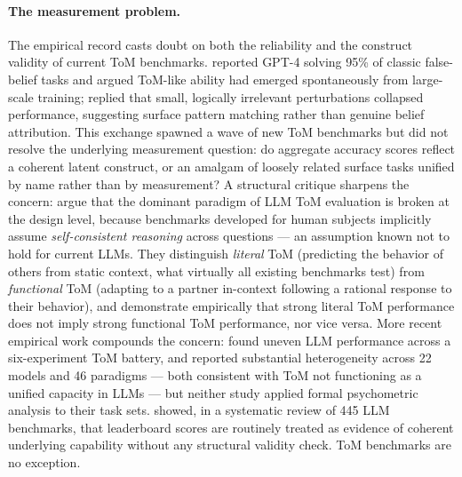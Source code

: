 \documentclass{article} %
\begin{document}
\paragraph{The measurement problem.}
The empirical record casts doubt on both the reliability and the
construct validity of current ToM benchmarks.
\citet{kosinski2024evaluating} reported GPT-4 solving 95\% of classic
false-belief tasks and argued ToM-like ability had emerged
spontaneously from large-scale training; \citet{ullman2023large}
replied that small, logically irrelevant perturbations collapsed
performance, suggesting surface pattern matching rather than genuine
belief attribution.
This exchange spawned a wave of new ToM benchmarks but did not resolve
the underlying measurement question: do aggregate accuracy scores
reflect a coherent latent construct, or an amalgam of loosely related
surface tasks unified by name rather than by measurement?
A structural critique sharpens the concern: \citet{riemer2024position}
argue that the dominant paradigm of LLM ToM evaluation is broken at the
design level, because benchmarks developed for human subjects implicitly
assume \textit{self-consistent reasoning} across questions --- an
assumption known not to hold for current LLMs.
They distinguish \textit{literal} ToM (predicting the behavior of
others from static context, what virtually all existing benchmarks
test) from \textit{functional} ToM (adapting to a partner in-context
following a rational response to their behavior), and demonstrate
empirically that strong literal ToM performance does not imply strong
functional ToM performance, nor vice versa.
More recent empirical work compounds the concern:
\citet{jones2024comparing} found uneven LLM performance across a
six-experiment ToM battery, and \citet{tong2026cogtom} reported
substantial heterogeneity across 22 models and 46 paradigms --- both
consistent with ToM not functioning as a unified capacity in LLMs ---
but neither study applied formal psychometric analysis to their task
sets.
\citet{bean2026measuring} showed, in a systematic review of 445 LLM
benchmarks, that leaderboard scores are routinely treated as evidence of
coherent underlying capability without any structural validity check.
ToM benchmarks are no exception.
 
\end{document}
